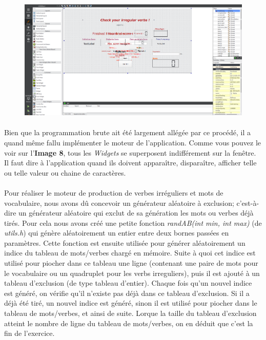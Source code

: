 \documentclass[12pt, a4paper]{report}
\begin{document}
\begin{figure}[H]
    \centering
    \includegraphics[scale=0.34]{images/qtcreator.png}
\end{figure}

\paragraph{}Bien que la programmation brute ait été largement allégée par ce procédé, il a quand même fallu implémenter le moteur de l'application. Comme vous pouvez le voir sur l'\textbf{Image 8}, tous les \textit{Widgets} se superposent indifférement sur la fenêtre. Il faut dire à l'application quand ils doivent apparaître, disparaître, afficher telle ou telle valeur ou chaine de caractères.

\paragraph{}Pour réaliser le moteur de production de verbes irréguliers et mots de vocabulaire, nous avons dû concevoir un générateur aléatoire à exclusion; c'est-à-dire un générateur aléatoire qui exclut de sa génération les mots ou verbes déjà tirés. Pour cela nous avons créé une petite fonction \textit{randAB(int min, int max)} (de \textit{utils.h}) qui génère aléatoirement un entier entre deux bornes passées en paramètres. Cette fonction est ensuite utilisée pour générer aléatoirement un indice du tableau de mots/verbes chargé en mémoire. Suite à quoi cet indice est utilisé pour piocher dans ce tableau une ligne (contenant une paire de mots pour le vocabulaire ou un quadruplet pour les verbs irreguliers), puis il est ajouté à un tableau d'exclusion (de type tableau d'entier). Chaque fois qu'un nouvel indice est généré, on vérifie qu'il n'existe pas déjà dans ce tableau d'exclusion. Si il a déjà été tiré, un nouvel indice est généré, sinon il est utilisé pour piocher dans le tableau de mots/verbes, et ainsi de suite. Lorque la taille du tableau d'exclusion atteint le nombre de ligne du tableau de mots/verbes, on en déduit que c'est la fin de l'exercice.
\end{document}
